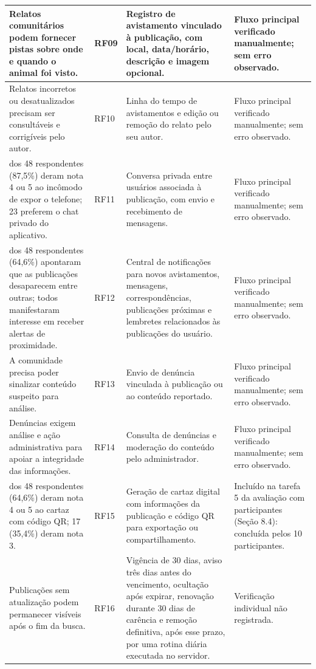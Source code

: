 {\begin{longtable}{|>{\raggedright\arraybackslash}p{4.1cm}|>{\centering\arraybackslash}p{1.8cm}|>{\raggedright\arraybackslash}p{5.4cm}|>{\raggedright\arraybackslash}p{2.7cm}|}
Relatos comunitários podem fornecer pistas sobre onde e quando o animal foi visto. & RF09 & Registro de avistamento vinculado à publicação, com local, data/horário, descrição e imagem opcional. & Fluxo principal verificado manualmente; sem erro observado. \\ \hline
Relatos incorretos ou desatualizados precisam ser consultáveis e corrigíveis pelo autor. & RF10 & Linha do tempo de avistamentos e edição ou remoção do relato pelo seu autor. & Fluxo principal verificado manualmente; sem erro observado. \\ \hline
42 dos 48 respondentes (87,5\%) deram nota 4 ou 5 ao incômodo de expor o telefone; 23 preferem o chat privado do aplicativo. & RF11 & Conversa privada entre usuários associada à publicação, com envio e recebimento de mensagens. & Fluxo principal verificado manualmente; sem erro observado. \\ \hline
31 dos 48 respondentes (64,6\%) apontaram que as publicações desaparecem entre outras; todos manifestaram interesse em receber alertas de proximidade. & RF12 & Central de notificações para novos avistamentos, mensagens, correspondências, publicações próximas e lembretes relacionados às publicações do usuário. & Fluxo principal verificado manualmente; sem erro observado. \\ \hline
A comunidade precisa poder sinalizar conteúdo suspeito para análise. & RF13 & Envio de denúncia vinculada à publicação ou ao conteúdo reportado. & Fluxo principal verificado manualmente; sem erro observado. \\ \hline
Denúncias exigem análise e ação administrativa para apoiar a integridade das informações. & RF14 & Consulta de denúncias e moderação do conteúdo pelo administrador. & Fluxo principal verificado manualmente; sem erro observado. \\ \hline
31 dos 48 respondentes (64,6\%) deram nota 4 ou 5 ao cartaz com código QR; 17 (35,4\%) deram nota 3. & RF15 & Geração de cartaz digital com informações da publicação e código QR para exportação ou compartilhamento. & Incluído na tarefa 5 da avaliação com participantes (Seção 8.4): concluída pelos 10 participantes. \\ \hline
Publicações sem atualização podem permanecer visíveis após o fim da busca. & RF16 & Vigência de 30 dias, aviso três dias antes do vencimento, ocultação após expirar, renovação durante 30 dias de carência e remoção definitiva, após esse prazo, por uma rotina diária executada no servidor. & Verificação individual não registrada. \\ \hline

\end{longtable}}
